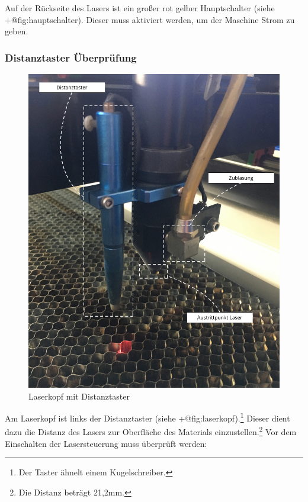 \documentclass[]{article}
\begin{document}
Auf der Rückseite des Lasers ist ein großer rot gelber Hauptschalter
(siehe +@fig:hauptschalter). Dieser muss aktiviert werden, um der
Maschine Strom zu geben.

\hypertarget{distanztaster-uxfcberpruxfcfung}{%
\subsubsection{Distanztaster
Überprüfung}\label{distanztaster-uxfcberpruxfcfung}}

\begin{figure}
\hypertarget{fig:laserkopf}{%
\centering
\includegraphics{assets/images/laserkopf-01.jpg}
\caption{Laserkopf mit Distanztaster}\label{fig:laserkopf}
}
\end{figure}

Am Laserkopf ist links der Distanztaster (siehe
+@fig:laserkopf).\footnote{Der Taster ähnelt einem Kugelschreiber.}
Dieser dient dazu die Distanz des Lasers zur Oberfläche des Materials
einzustellen.\footnote{Die Distanz beträgt 21,2mm.} Vor dem Einschalten
der Lasersteuerung muss überprüft werden:
\end{document}
